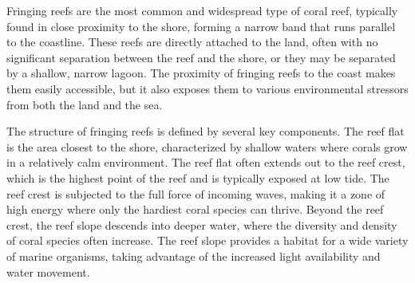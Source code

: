 

Fringing reefs are the most common and widespread type of coral reef, typically found in close proximity to the shore, forming a narrow band that runs parallel to the coastline. These reefs are directly attached to the land, often with no significant separation between the reef and the shore, or they may be separated by a shallow, narrow lagoon. The proximity of fringing reefs to the coast makes them easily accessible, but it also exposes them to various environmental stressors from both the land and the sea.

The structure of fringing reefs is defined by several key components. The reef flat is the area closest to the shore, characterized by shallow waters where corals grow in a relatively calm environment. The reef flat often extends out to the reef crest, which is the highest point of the reef and is typically exposed at low tide. The reef crest is subjected to the full force of incoming waves, making it a zone of high energy where only the hardiest coral species can thrive. Beyond the reef crest, the reef slope descends into deeper water, where the diversity and density of coral species often increase. The reef slope provides a habitat for a wide variety of marine organisms, taking advantage of the increased light availability and water movement.

